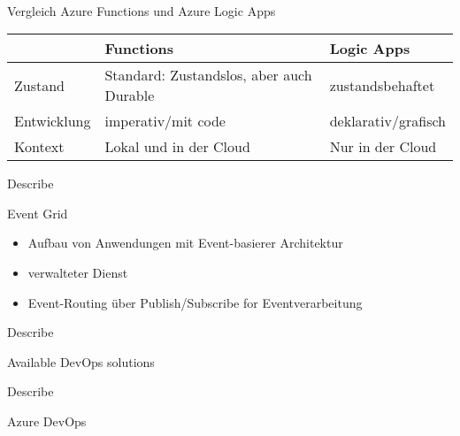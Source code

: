 \documentclass{scrartcl}
\newenvironment{flashcard}[2][]{%
    #1
    \vfill
    \centerline{\Large{#2}}
    \vfill
\newpage
}
{\newpage}
\begin{document}
    \begin{flashcard}[\ ]{Vergleich Azure Functions und Azure Logic Apps}
        \begin{tabular}{l|p{34mm}p{34mm}}
                 & \textbf{Functions}                                             & \textbf{Logic Apps} \\
          \hline
          Zustand & Standard: Zustandslos, aber auch Durable                  & zustandsbehaftet                                                                         \\
          Entwicklung & imperativ/mit code                                        & deklarativ/grafisch                                                               \\
          Kontext  & Lokal und in der Cloud                                    & Nur in der Cloud                                                                  \\
        \end{tabular}
    \end{flashcard}

    \begin{flashcard}[Describe]{Event Grid}
        \begin{itemize}
            \item Aufbau von Anwendungen mit Event-basierer Architektur
            \item verwalteter Dienst
            \item Event-Routing über Publish/Subscribe for Eventverarbeitung
        \end{itemize}

    \end{flashcard}

    \begin{flashcard}[Describe]{Available DevOps solutions}

    \end{flashcard}

    \begin{flashcard}[Describe]{Azure DevOps}

    \end{flashcard}
\end{document}
